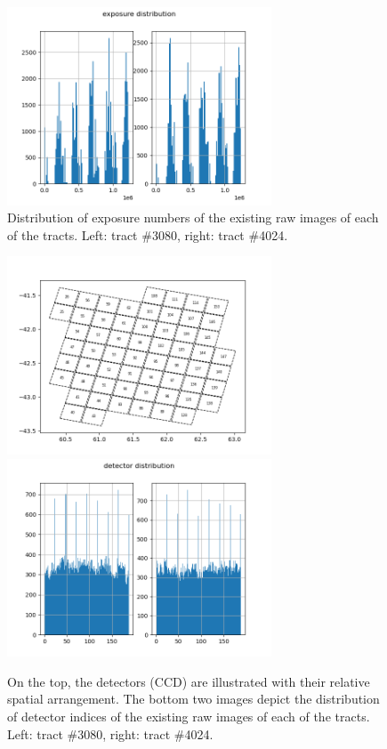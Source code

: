 \documentclass[DM,authoryear,toc]{lsstdoc}
\begin{document}
\begin{figure}[h]
  \centering
  \includegraphics[width=0.7\textwidth]{exposure_hist.png}
  \caption{Distribution of exposure numbers of the existing raw images of each of the tracts. Left: tract \#3080, right: tract \#4024.}
  \label{fig:exposure_hist}
\end{figure}

\begin{figure}[h]
  \centering
  \includegraphics[width=0.7\textwidth]{tract_detectors.png}
  \includegraphics[width=0.7\textwidth]{detector_hist.png}
  \caption{On the top, the detectors (CCD) are illustrated with their relative spatial arrangement. The bottom two images depict the distribution of detector indices of the existing raw images of each of the tracts. Left: tract \#3080, right: tract \#4024.}
  \label{fig:detector_hist}
\end{figure}
\end{document}
